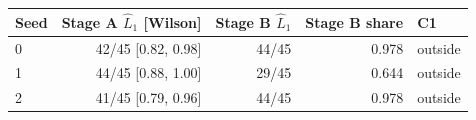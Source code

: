\begin{tabular}{lrrrl}
\toprule
Seed & Stage A $\hat L_1$ [Wilson] & Stage B $\hat L_1$ & Stage B share & C1 \\
\midrule
0 & 42/45 [0.82, 0.98] & 44/45 & 0.978 & outside \\
1 & 44/45 [0.88, 1.00] & 29/45 & 0.644 & outside \\
2 & 41/45 [0.79, 0.96] & 44/45 & 0.978 & outside \\
\bottomrule
\end{tabular}
